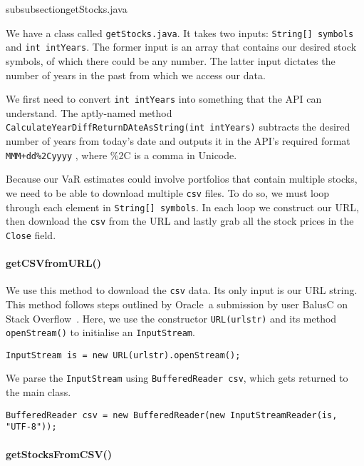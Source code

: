 \documentclass[../Dissertation.tex]{subfiles}
\begin{document}
subsubsection{getStocks.java}

We have a class called \lstinline|getStocks.java|.
It takes two inputs: \lstinline|String[] symbols| and \lstinline|int intYears|.
The former input is an array that contains our desired stock symbols, of which there could be any number.
The latter input dictates the number of years in the past from which we access our data.

We first need to convert \lstinline|int intYears| into something that the API can understand.
The aptly-named method \lstinline|CalculateYearDiffReturnDAteAsString(int intYears)| subtracts the desired number of years from today's date and outputs it in the API's required format \lstinline|MMM+dd%2Cyyyy|
, where \%2C is a comma in Unicode.

Because our VaR estimates could involve portfolios that contain multiple stocks, we need to be able to download multiple \lstinline|csv| files.
To do so, we must loop through each element in \lstinline|String[] symbols|.
In each loop we construct our URL, then download the \lstinline|csv| from the URL and lastly grab all the stock prices in the \lstinline|Close| field.

\paragraph{getCSVfromURL()}

We use this method to download the \lstinline|csv| data. 
Its only input is our URL string.
This method follows steps outlined by Oracle~\cite{Oracle:2015}a submission by user BalusC on Stack Overflow~\cite{BalusC:2010a}.
Here, we use the constructor \lstinline|URL(urlstr)| and its method \lstinline|openStream()| to initialise an \lstinline|InputStream|.
\begin{lstlisting}[firstnumber = 16]
InputStream is = new URL(urlstr).openStream();
\end{lstlisting}
We parse the \lstinline|InputStream| using \lstinline|BufferedReader csv|, which gets returned to the main class.
\begin{lstlisting}[firstnumber = 18]
BufferedReader csv = new BufferedReader(new InputStreamReader(is, "UTF-8"));
\end{lstlisting}

\paragraph{getStocksFromCSV()}
\end{document}
